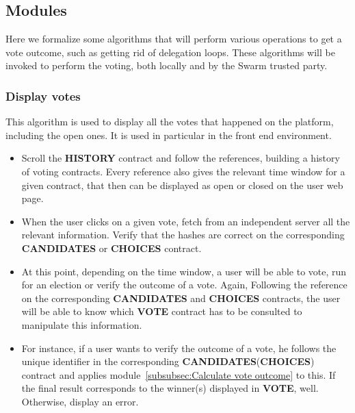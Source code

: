 \documentclass[submission, copyright,creativecommons,sharealike,noncommercial]{eptcs}
\newcommand{\Candidates}{\textbf{CANDIDATES}\xspace}
\newcommand{\Choices}{\textbf{CHOICES}\xspace}
\newcommand{\Vote}{\textbf{VOTE}\xspace}
\newcommand{\History}{\textbf{HISTORY}\xspace}
\begin{document}
\subsection{Modules}\label{subsec:Modules}
%	
	Here we formalize some algorithms that will perform various operations to get a vote outcome, such as getting rid of delegation loops. These algorithms will be invoked to perform the voting, both locally and by the Swarm trusted party.
	
\subsubsection{Display votes}\label{subsubsec:Display votes}
	This algorithm is used to display all the votes that happened on the platform, including the open ones. It is used in particular in the front end environment.
	\begin{itemize}
		\item Scroll the \History contract and follow the references, building a history of voting contracts. Every reference also gives the relevant time window for a given contract, that then can be displayed as open or closed on the user web page.
		
		\item When the user clicks on a given vote, fetch from an independent server all the relevant information. Verify that the hashes are correct on the corresponding \Candidates or \Choices contract.
		
		\item At this point, depending on the time window, a user will be able to vote, run for an election or verify the outcome of a vote. Again, Following the reference on the corresponding \Candidates and \Choices contracts, the user will be able to know which \Vote contract has to be consulted to manipulate this information.
		
		\item For instance, if a user wants to verify the outcome of a vote, he follows the unique identifier in the corresponding \Candidates (\Choices) contract and applies module~\ref{subsubsec:Calculate vote outcome} to this. If the final result corresponds to the winner(s) displayed in \Vote, well. Otherwise, display an error.
	\end{itemize}
\end{document}
